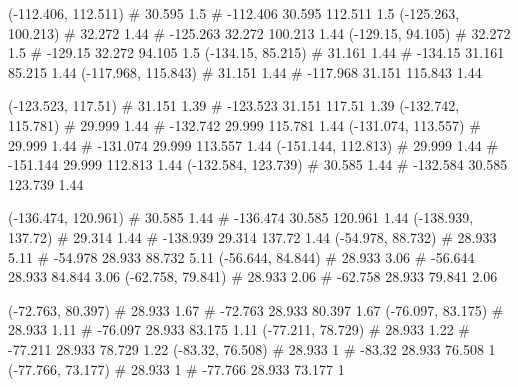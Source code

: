 \documentclass[a4paper,openbib,10pt]{article}
\newenvironment{treegraph}{\begin{graph}}{\end{graph}}
\begin{document}
\begin{treegraph}
  (-112.406, 112.511) #     30.595    1.5
   #    -112.406    30.595    112.511    1.5
  (-125.263, 100.213) #     32.272    1.44
   #    -125.263    32.272    100.213    1.44
  (-129.15, 94.105) #     32.272    1.5
   #    -129.15    32.272    94.105    1.5
  (-134.15, 85.215) #     31.161    1.44
   #    -134.15    31.161    85.215    1.44
  (-117.968, 115.843) #     31.151    1.44
   #    -117.968    31.151    115.843    1.44

  (-123.523, 117.51) #     31.151    1.39
   #    -123.523    31.151    117.51    1.39
  (-132.742, 115.781) #     29.999    1.44
   #    -132.742    29.999    115.781    1.44
  (-131.074, 113.557) #     29.999    1.44
   #    -131.074    29.999    113.557    1.44
  (-151.144, 112.813) #     29.999    1.44
   #    -151.144    29.999    112.813    1.44
  (-132.584, 123.739) #     30.585    1.44
   #    -132.584    30.585    123.739    1.44

  (-136.474, 120.961) #     30.585    1.44
   #    -136.474    30.585    120.961    1.44
  (-138.939, 137.72) #     29.314    1.44
   #    -138.939    29.314    137.72    1.44
  (-54.978, 88.732) #     28.933    5.11
   #    -54.978    28.933    88.732    5.11
  (-56.644, 84.844) #     28.933    3.06
   #    -56.644    28.933    84.844    3.06
  (-62.758, 79.841) #     28.933    2.06
   #    -62.758    28.933    79.841    2.06

  (-72.763, 80.397) #     28.933    1.67
   #    -72.763    28.933    80.397    1.67
  (-76.097, 83.175) #     28.933    1.11
   #    -76.097    28.933    83.175    1.11
  (-77.211, 78.729) #     28.933    1.22
   #    -77.211    28.933    78.729    1.22
  (-83.32, 76.508) #     28.933    1
   #    -83.32    28.933    76.508    1
  (-77.766, 73.177) #     28.933    1
   #    -77.766    28.933    73.177    1


\end{treegraph}
\end{document}
